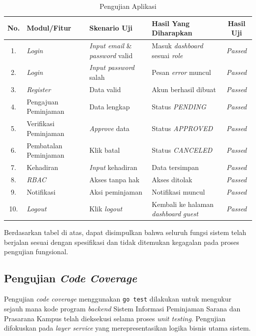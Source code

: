 \begin{table}[H]
    \centering
    \caption{Pengujian Aplikasi}
    \label{tab:pengujian_aplikasi}
    \begin{tabularx}{\textwidth}{|c|l|X|X|c|}
        \hline
        No. & Modul/Fitur & Skenario Uji & Hasil Yang Diharapkan & Hasil Uji \\
        \hline
        1. & \textit{Login} & \textit{Input email} \& \textit{password} valid & Masuk \textit{dashboard} sesuai \textit{role} & \textit{Passed} \\
        \hline
        2. & \textit{Login} & \textit{Input password} salah & Pesan \textit{error} muncul & \textit{Passed} \\
        \hline
        3. & \textit{Register} & Data valid & Akun berhasil dibuat & \textit{Passed} \\
        \hline
        4. & Pengajuan Peminjaman & Data lengkap & Status \textit{PENDING} & \textit{Passed} \\
        \hline
        5. & Verifikasi Peminjaman & \textit{Approve} data & Status \textit{APPROVED} & \textit{Passed} \\
        \hline
        6. & Pembatalan Peminjaman & Klik batal & Status \textit{CANCELED} & \textit{Passed} \\
        \hline
        7. & Kehadiran & \textit{Input} kehadiran & Data tersimpan & \textit{Passed} \\
        \hline
        8. & \textit{RBAC} & Akses tanpa hak & Akses ditolak & \textit{Passed} \\
        \hline
        9. & Notifikasi & Aksi peminjaman & Notifikasi muncul & \textit{Passed} \\
        \hline
        10. & \textit{Logout} & Klik \textit{logout} & Kembali ke halaman \textit{dashboard} \textit{guest} & \textit{Passed} \\
        \hline
    \end{tabularx}
\end{table}
\vspace{-0.5cm}

Berdasarkan tabel di atas, dapat disimpulkan bahwa seluruh fungsi sistem telah berjalan sesuai dengan spesifikasi dan tidak ditemukan kegagalan pada proses pengujian fungsional.

\subsection{Pengujian \textit{Code Coverage}}
Pengujian \textit{code coverage} menggunakan \texttt{go test} dilakukan untuk mengukur sejauh mana kode program \textit{backend} Sistem Informasi Peminjaman Sarana dan Prasarana Kampus telah dieksekusi selama proses \textit{unit testing}. Pengujian difokuskan pada \textit{layer service} yang merepresentasikan logika bisnis utama sistem.

